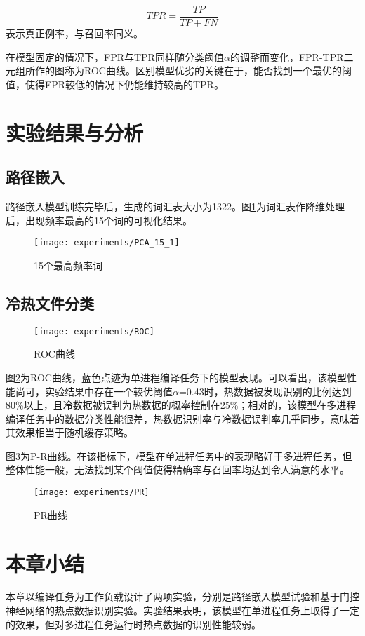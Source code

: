 \begin{equation}
    TPR = \frac{TP}{TP+FN}
\end{equation}
表示真正例率，与召回率同义。

在模型固定的情况下，FPR与TPR同样随分类阈值$\alpha$的调整而变化，FPR-TPR二元组所作的图称为ROC曲线。区别模型优劣的关键在于，能否找到一个最优的阈值，使得FPR较低的情况下仍能维持较高的TPR。

\section{实验结果与分析}

\subsection{路径嵌入}
路径嵌入模型训练完毕后，生成的词汇表大小为1322。图\ref{fig:experiments/PCA_15_1}为词汇表作降维处理后，出现频率最高的15个词的可视化结果。
\begin{figure}[htp]
\centering
\texttt{[image: experiments/PCA\_15\_1]}
\caption{15个最高频率词}
\label{fig:experiments/PCA_15_1}
\end{figure}




\subsection{冷热文件分类}


\begin{figure}[htp]
\centering
\texttt{[image: experiments/ROC]}
\caption{ROC曲线}
\label{fig:ROC}
\end{figure}

图\ref{fig:ROC}为ROC曲线，蓝色点迹为单进程编译任务下的模型表现。可以看出，该模型性能尚可，实验结果中存在一个较优阈值$\alpha$=0.43时，热数据被发现识别的比例达到80\%以上，且冷数据被误判为热数据的概率控制在25\%；相对的，该模型在多进程编译任务中的数据分类性能很差，热数据识别率与冷数据误判率几乎同步，意味着其效果相当于随机缓存策略。

图\ref{fig:PR}为P-R曲线。在该指标下，模型在单进程任务中的表现略好于多进程任务，但整体性能一般，无法找到某个阈值使得精确率与召回率均达到令人满意的水平。

\begin{figure}[htp]
\centering
\texttt{[image: experiments/PR]}
\caption{PR曲线}
\label{fig:PR}
\end{figure}

\section{本章小结}
本章以编译任务为工作负载设计了两项实验，分别是路径嵌入模型试验和基于门控神经网络的热点数据识别实验。实验结果表明，该模型在单进程任务上取得了一定的效果，但对多进程任务运行时热点数据的识别性能较弱。